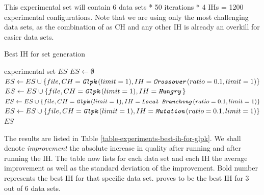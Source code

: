 This experimental set will contain 6 data sets * 50 iterations * 4 IHs = 1200 experimental configurations. Note that we are using only the most challenging data sets, as the combination of  as CH and any other IH is already an overkill for easier data sets.

\begin{algorithm}
\caption{Best IH for  set generation}
\label{listing-experiment-best-ih-for-glpk}
\begin{algorithmic}
\ENSURE experimental set $ES$
\STATE $ES \gets \emptyset$
    	\STATE $ES \gets ES \cup \{file, CH = \texttt{\textit{Glpk}}(limit = 1), IH = \texttt{\textit{Crossover}}(ratio = 0.1, limit = 1)\}$
    	\STATE $ES \gets ES \cup \{file, CH = \texttt{\textit{Glpk}}(limit = 1), IH = \texttt{\textit{Hungry}}\}$
    	\STATE $ES \gets ES \cup \{file, CH = \texttt{\textit{Glpk}}(limit = 1), IH = \texttt{\textit{Local Branching}}(ratio = 0.1, limit = 1)\}$
    	\STATE $ES \gets ES \cup \{file, CH = \texttt{\textit{Glpk}}(limit = 1), IH = \texttt{\textit{Mutation}}(ratio = 0.1, limit = 1)\}$
  \ENDFOR
\ENDFOR
\RETURN $ES$
\end{algorithmic}
\end{algorithm}

The results are listed in Table \ref{table-experiments-best-ih-for-glpk}. We shall denote \textit{improvement} the absolute increase in quality after running  and after running the IH. The table now lists for each data set and each IH the average improvement as well as the standard deviation of the improvement. Bold number represents the best IH for that specific data set.  proves to be the best IH for 3 out of 6 data sets.


